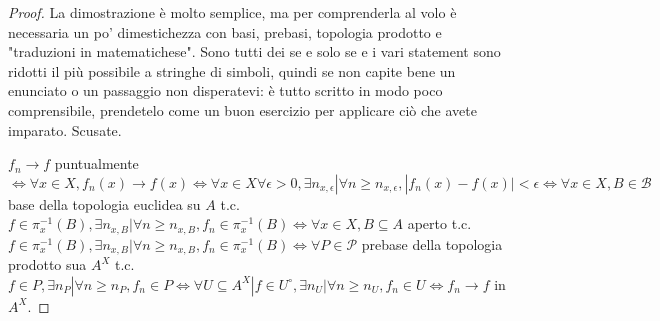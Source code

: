 \begin{proof}
  La dimostrazione è molto semplice, ma per comprenderla al volo è necessaria un po' dimestichezza con basi, prebasi, topologia prodotto e "traduzioni in matematichese". Sono tutti dei se e solo se e i vari statement sono ridotti il più possibile a stringhe di simboli, quindi se non capite bene un enunciato o un passaggio non disperatevi: è tutto scritto in modo poco comprensibile, prendetelo come un buon esercizio per applicare ciò che avete imparato. Scusate.

  $f_n \rightarrow f$ puntualmente $\Leftrightarrow \forall x \in X, f_n(x) \rightarrow f(x) \Leftrightarrow \forall x \in X \forall \epsilon>0, \exists n_{x, \epsilon} | \forall n \ge n_{x, \epsilon}, |f_n(x)-f(x)|<\epsilon \Leftrightarrow \forall x \in X, B \in \mathcal{B}$
  base della topologia euclidea su $A$ t.c. $f \in \pi_x^{-1}(B), \exists n_{x, B} | \forall n \ge n_{x, B}, f_n \in \pi_x^{-1}(B) \Leftrightarrow \forall x \in X, B \subseteq A$ aperto t.c.
  $f \in \pi_x^{-1}(B), \exists n_{x, B} | \forall n \ge n_{x, B}, f_n \in \pi_x^{-1}(B) \Leftrightarrow \forall P \in \mathcal{P}$ prebase della topologia prodotto sua $A^X$ t.c.
  $f \in P, \exists n_P | \forall n \ge n_P, f_n \in P \Leftrightarrow \forall U \subseteq A^X | f \in U^{\circ}, \exists n_U | \forall n \ge n_U, f_n \in U \Leftrightarrow f_n \rightarrow f$ in $A^X$.
\end{proof}
